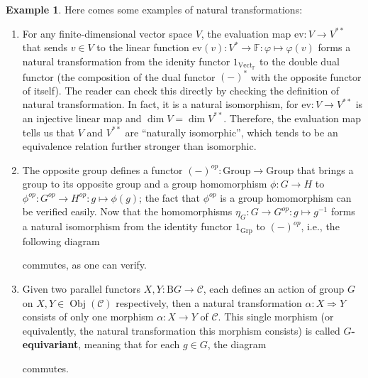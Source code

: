 \documentclass{article}
\theoremstyle{definition}
\theoremstyle{definition}
\newtheorem{example}{Example}[section]
\theoremstyle{remark}
\DeclareMathOperator{\Obj}{Obj}
\begin{document}
	\begin{example}
	Here comes some examples of natural transformations:
	\begin{enumerate}[label=(\roman*)]
		\item For any finite-dimensional vector space $V$, the evaluation map $\mathrm{ev}:V\to V^{**}$ that sends $v\in V$ to the linear function $\mathrm{ev}(v):V^*\to \mathbb{F}:\varphi\mapsto \varphi(v)$ forms a natural transformation from the idenity functor $1_{\mathrm{Vect}_\mathbb{F}}$ to the double dual functor (the composition of the dual functor $(-)^*$ with the opposite functor of itself). The reader can check this directly by checking the definition of natural transformation. In fact, it is a natural isomorphism, for $\mathrm{ev}:V\to V^{**}$ is an injective linear map and $\dim V=\dim V^{**}$. Therefore, the evaluation map tells us that $V$ and $V^{**}$ are ``naturally isomorphic'', which tends to be an equivalence relation further stronger than isomorphic.
		\item The opposite group defines a functor $(-)^{op}:\mathrm{Group}\to\mathrm{Group}$ that brings a group to its opposite group and a group homomorphism $\phi:G\to H$ to $\phi^{op}:G^{op}\to H^{op}:g\mapsto \phi(g)$; the fact that $\phi^{op}$ is a group homomorphism can be verified easily. Now that the homomorphisms $\eta_G:G\to G^{op}:g\mapsto g^{-1}$ forms a natural isomorphism from the identity functor $1_{\mathrm{Grp}}$ to $(-)^{op}$, i.e., the following diagram
		\begin{center}
		\end{center}
		commutes, as one can verify.
		\item Given two parallel functors $X,Y:\mathrm{B}G\to \mathcal{C}$, each defines an action of group $G$ on $X,Y\in\Obj(\mathcal{C})$ respectively, then a natural transformation $\alpha:X\Rightarrow Y$ consists of only one morphism $\alpha:X\to Y$ of $\mathcal{C}$. This single morphism (or equivalently, the natural transformation this morphism consists) is called $G$\textbf{-equivariant}, meaning that for each $g\in G$, the diagram
		\begin{center}
		\end{center}
		commutes.
	\end{enumerate}
	\end{example}
\end{document}

